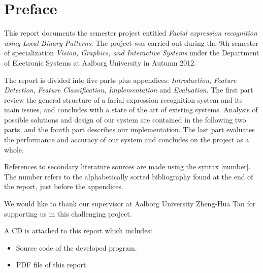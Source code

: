 \thispagestyle{plain}
\hypersetup{bookmarksdepth=-2} %
\chapter*{Preface}
\hypersetup{bookmarksdepth}%

\noindent This report documents the semester project entitled \textit{Facial expression recognition using Local Binary Patterns}. The project was carried out during the 9th semester of specialization \textit{Vision, Graphics, and Interactive Systems} under the Department of Electronic Systems at Aalborg University in Autumn 2012. 
\newline

\noindent The report is divided into five parts plus appendices: \textit{Introduction}, \textit{Feature Detection}, \textit{Feature Classification}, \textit{Implementation} and \textit{Evaluation}. The first part review the general structure of a facial expression recognition system and its main issues, and concludes with a state of the art of existing systems. Analysis of possible solutions and design of our system are contained in the following two parts, and the fourth part describes our implementation. The last part evaluates the performance and accuracy of our system and concludes on the project as a whole. 
\newline

\noindent References to secondary literature sources are made using the syntax [number]. The number refers to the alphabetically sorted bibliography found at the end of the report, just before the appendices.
\newline

\noindent We would like to thank our supervisor at Aalborg University Zheng-Hua Tan for supporting us in this challenging project. 
\newline

\noindent A CD is attached to this report which includes:
\begin{itemize}
\item Source code of the developed program.
\item PDF file of this report.
\end{itemize}

